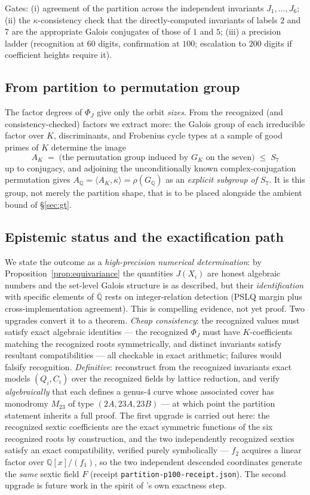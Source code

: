 \documentclass[11pt]{amsart}
\newcommand{\QQ}{\mathbb{Q}}
\newcommand{\GK}{G_{K}}
\newcommand{\Mtw}{M_{23}}
\newcommand{\kap}{\kappa}
\theoremstyle{plain}
\theoremstyle{definition}
\begin{document}
Gates: (i) agreement of the partition across the independent
invariants $J_1,\dots,J_6$; (ii) the $\kap$-consistency check that
the directly-computed invariants of labels $2$ and $7$ are the
appropriate Galois conjugates of those of $1$ and $5$; (iii) a
precision ladder (recognition at $60$ digits, confirmation at $100$;
escalation to $200$ digits if coefficient heights require it).

\subsection*{From partition to permutation group}
The factor degrees of $\Phi_J$ give only the orbit \emph{sizes}. From
the recognized (and consistency-checked) factors we extract more: the
Galois group of each irreducible factor over $K$, discriminants, and
Frobenius cycle types at a sample of good primes of $K$ determine the
image
\[
  A_K \;=\; \text{(the permutation group induced by }\GK\text{ on the
  seven)} \;\le\; S_7
\]
up to conjugacy, and adjoining the unconditionally known
complex-conjugation permutation gives
$A_\QQ=\langle A_K,\kap\rangle=\rho(G_\QQ)$ as an \emph{explicit
subgroup of $S_7$}. It is this group, not merely the partition
shape, that is to be placed alongside the ambient bound of
\S\ref{sec:gt}.

\subsection*{Epistemic status and the exactification path}
We state the outcome as a \emph{high-precision numerical
determination}: by Proposition~\ref{prop:equivariance} the quantities
$J(X_i)$ are honest algebraic numbers and the set-level Galois
structure is as described, but their \emph{identification} with
specific elements of $\overline{\QQ}$ rests on integer-relation
detection (PSLQ margin plus cross-implementation agreement). This is
compelling evidence, not yet proof. Two upgrades convert it to a
theorem. \emph{Cheap consistency}: the recognized values must satisfy
exact algebraic identities --- the recognized $\Phi_J$ must have
$K$-coefficients matching the recognized roots symmetrically, and
distinct invariants satisfy resultant compatibilities --- all
checkable in exact arithmetic; failures would falsify recognition.
\emph{Definitive}: reconstruct from the recognized invariants exact
models $(Q_i, C_i)$ over the recognized fields by lattice reduction,
and verify \emph{algebraically} that each defines a genus-$4$ curve
whose associated cover has monodromy $\Mtw$ of type
$(2A,23A,23B)$ --- at which point the partition statement inherits a
full proof. The first upgrade is carried out here: the recognized
sextic coefficients are the exact symmetric functions of the six
recognized roots by construction, and the two independently
recognized sextics satisfy an exact compatibility, verified purely
symbolically --- $f_2$ acquires a linear factor over
$\QQ[x]/(f_1)$, so the two independent descended coordinates
generate the \emph{same} sextic field $F$
(receipt \texttt{partition-p100-receipt.json}). The second upgrade
is future work in the spirit of \cite{HJLPPZ}'s own exactness step.
\end{document}
